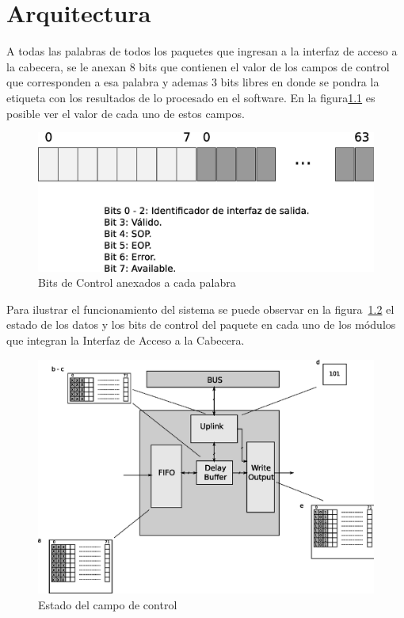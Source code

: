 \chapter{Arquitectura}

A todas las palabras de todos los paquetes que ingresan a la interfaz de acceso a la cabecera, se le anexan 8 bits que contienen el valor de los campos de control que corresponden a esa palabra y ademas 3 bits libres en donde se pondra la etiqueta con los resultados de lo procesado en el software. En la figura\ref{fig:datocontrol}  es posible ver el valor de cada uno de estos campos.

\begin{figure}[H]
  \centering
	\includegraphics[scale=0.40]{3-arquitectura/graf/datocontrol.eps}
  \caption{Bits de Control anexados a cada palabra}
  \label{fig:datocontrol}
\end{figure}

Para ilustrar el funcionamiento del sistema se puede observar en la figura~\ref{fig:interfaz1} el estado de los datos y los bits de control del paquete en cada uno de los módulos que integran la Interfaz de Acceso a la Cabecera.

\begin{figure}[H]
  \centering
	\includegraphics[scale=0.60]{3-arquitectura/graf/moduloexp.eps}
  \caption{Estado del campo de control}
  \label{fig:interfaz1}
\end{figure}

